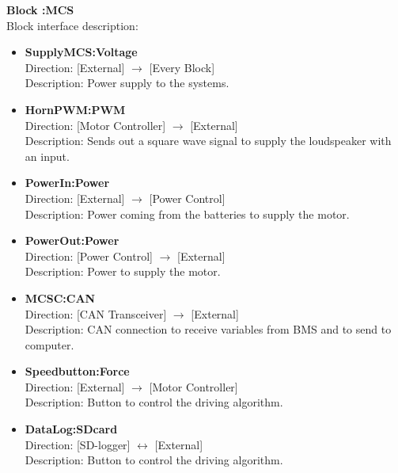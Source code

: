 \textbf{Block :MCS}\\
Block interface description:
\begin{itemize}
	\item \textbf{SupplyMCS:Voltage}\\
	Direction: [External] $\rightarrow$ [Every Block]\\
	Description: Power supply to the systems.
	\item \textbf{HornPWM:PWM}\\
	Direction: [Motor Controller] $\rightarrow$ [External]\\
	Description: Sends out a square wave signal to supply the loudspeaker with an input.
	\item \textbf{PowerIn:Power}\\
	Direction: [External] $\rightarrow$ [Power Control]\\
	Description: Power coming from the batteries to supply the motor.
	\item \textbf{PowerOut:Power}\\
	Direction: [Power Control] $\rightarrow$ [External]\\
	Description: Power to supply the motor.
	\item \textbf{MCSC:CAN}\\
	Direction: [CAN Transceiver] $\rightarrow$ [External]\\
	Description: CAN connection to receive variables from BMS and to send to computer.
	\item \textbf{Speedbutton:Force}\\
	Direction: [External] $\rightarrow$ [Motor Controller]\\
	Description: Button to control the driving algorithm.
	\item \textbf{DataLog:SDcard}\\
	Direction: [SD-logger] $\leftrightarrow$ [External]\\
	Description: Button to control the driving algorithm.
\end{itemize}

